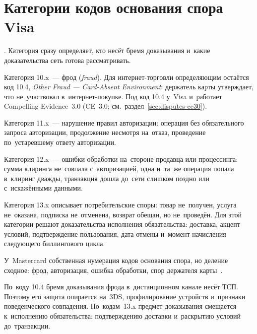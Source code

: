 \section{Категории кодов основания спора Visa}\label{sec:disputes-reason-codes}

. Категория сразу определяет, кто несёт
бремя доказывания и~какие доказательства сеть готова рассматривать.

Категория 10.x~--- фрод (\textit{fraud}). Для интернет-торговли определяющим
остаётся код 10.4, \textit{Other Fraud --- Card-Absent Environment}: держатель
карты утверждает, что не~участвовал в~интернет-покупке. Под код 10.4 у~Visa
и~работает Compelling Evidence~3.0 (CE~3.0;
см.~раздел~\ref{sec:disputes-ce30}).

Категория 11.x~--- нарушение правил авторизации: операция без обязательного
запроса авторизации, продолжение несмотря на~отказ, проведение по~устаревшему
ответу авторизации.

Категория 12.x~--- ошибки обработки на~стороне продавца или процессинга: сумма
клиринга не~совпала с~авторизацией, одна и~та~же операция попала в~клиринг
дважды, транзакция дошла до~сети слишком поздно или с~искажёнными данными.

Категория 13.x описывает потребительские споры: товар не~получен, услуга
не~оказана, подписка не~отменена, возврат обещан, но не~проведён. Для этой
категории решают доказательства исполнения обязательства:
доставка, акцепт условий, подтверждение пользования, дата отмены и~момент
начисления следующего биллингового цикла.

У~Mastercard собственная нумерация кодов основания спора, но деление сходное:
фрод, авторизация, ошибка обработки, спор держателя
карты~\cite{mc-chargeback-guide}.

По~коду 10.4 бремя доказывания фрода в~дистанционном канале несёт ТСП.
Поэтому его защита опирается на~3DS, профилирование устройств и~признаки
поведенческого совпадения. По~кодам~13.x предмет доказывания смещается к~исполнению обязательства:
подтверждению доставки и~раскрытию условий до~транзакции.

